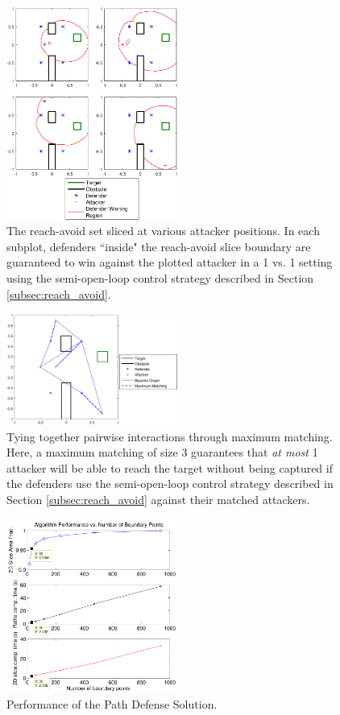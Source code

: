\begin{figure}
	\centering
	\includegraphics[width=0.5\textwidth]{"fig/OLGame_pw_results_PD"}
	\caption{The reach-avoid set sliced at various attacker positions. In each subplot, defenders ``inside" the reach-avoid slice boundary are guaranteed to win against the plotted attacker in a 1 vs. 1 setting using the semi-open-loop control strategy described in Section \ref{subsec:reach_avoid}.}
	\label{fig:pd_pw}
\end{figure}

\begin{figure}
	\centering
	\includegraphics[width=0.5\textwidth]{"fig/OLGame_mm_results_PD"}
	\caption{Tying together pairwise interactions through maximum matching. Here, a maximum matching of size 3 guarantees that \textit{at most} 1 attacker will be able to reach the target without being captured if the defenders use the semi-open-loop control strategy described in Section \ref{subsec:reach_avoid} against their matched attackers.}
	\label{fig:pd_mm}
\end{figure}

\begin{figure}
	\centering
	\includegraphics[width=0.5\textwidth]{"fig/alg_perf_Rc"}
	\caption{Performance of the Path Defense Solution.}
	\label{fig:pd_perf}
\end{figure}

